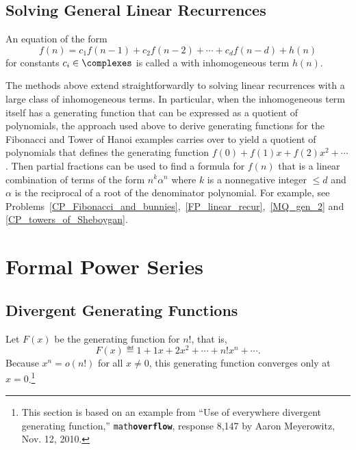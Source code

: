 \subsection{Solving General Linear Recurrences}
An equation of the form
\begin{equation}\label{fnc1c2}
f(n) = c_1 f(n-1) + c_2 f(n-2) +  \cdots + c_{d} f(n-d) + h(n)
\end{equation}
for constants $c_i \in \complexes$ is called a  with inhomogeneous term $h(n)$.

The methods above extend straightforwardly to solving linear
recurrences with a large class of inhomogeneous terms.  In particular,
when the inhomogeneous term itself has a generating function that can
be expressed as a quotient of polynomials, the approach used above to
derive generating functions for the Fibonacci and Tower of Hanoi
examples carries over to yield a quotient of polynomials that defines
the generating function $f(0)+f(1)x+f(2)x^2+\cdots$.  Then partial
fractions can be used to find a formula for $f(n)$ that is a linear
combination of terms of the form $n^k\alpha^n$ where $k$ is a
nonnegative integer $\leq d$ and $\alpha$ is the reciprocal of a
root of the denominator polynomial.  For example, see
Problems~\ref{CP_Fibonacci_and_bunnies},~\ref{FP_linear_recur},~\ref{MQ_gen_2} and
\ref{CP_towers_of_Sheboygan}.

\begin{problems}
\practiceproblems
{}

\classproblems
{}

\homeworkproblems
{}

\examproblems
{}

\end{problems}

\section{Formal Power Series}\label{sec:power_series}

\subsection{Divergent Generating Functions}
Let $F(x)$ be the generating function for $n!$, that is,
\[
F(x) \eqdef 1 + 1x + 2x^2 + \cdots + n! x^n + \cdots.
\]
Because $x^n = o(n!)$ for all $x \neq 0$, this generating function
converges only at $x=0$.\footnote{This section is based on an example
  from ``Use of everywhere divergent generating function,''
  \texttt{math}\textbf{\texttt{overflow}}, response 8,147 by Aaron
  Meyerowitz, Nov. 12, 2010.}


